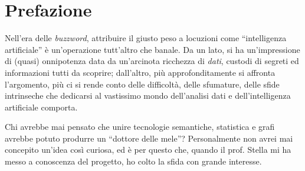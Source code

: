 \newpage
\cleardoublepage
\begingroup
\let\clearpage\endgroup
\null{}
\chapter*{\centering Prefazione}

Nell'era delle \textit{buzzword}, attribuire il giusto peso a locuzioni come ``intelligenza artificiale'' è  un'operazione tutt'altro che banale. 
Da un lato, si ha un'impressione di (quasi) onnipotenza data da un'arcinota ricchezza di \textit{dati}, custodi di segreti ed informazioni tutti da scoprire; dall'altro, più approfonditamente si affronta l'argomento, più ci si rende conto delle difficoltà, delle sfumature, delle sfide intrinseche che dedicarsi al vastissimo mondo dell'analisi dati e dell'intelligenza artificiale comporta.

Chi avrebbe mai pensato che unire tecnologie semantiche, statistica e grafi avrebbe potuto produrre un ``dottore delle mele''? Personalmente non avrei mai concepito un'idea così curiosa, ed è per questo che, quando il prof. Stella mi ha messo a conoscenza del progetto, ho colto la sfida con grande interesse.

 \null
